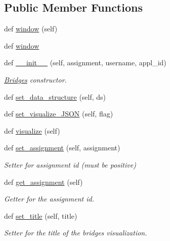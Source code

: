 \subsection*{Public Member Functions}
\begin{DoxyCompactItemize}
\item 
def \hyperlink{classbridges_1_1bridges_1_1_bridges_a1340374df9e4aa1490d9cd9be2b0e918}{window} (self)
\item 
def \hyperlink{classbridges_1_1bridges_1_1_bridges_ab434ee3f7b3b8c9eb4f8a07d97789a82}{window}
\item 
def \hyperlink{classbridges_1_1bridges_1_1_bridges_af174072883f6f269a9fe7cc02e12c276}{\+\_\+\+\_\+init\+\_\+\+\_\+} (self, assignment, username, appl\+\_\+id)
\begin{DoxyCompactList}\small\item\em \hyperlink{classbridges_1_1bridges_1_1_bridges}{Bridges} constructor. \end{DoxyCompactList}\item 
def \hyperlink{classbridges_1_1bridges_1_1_bridges_a868f02fa66c87c1a1fc7bd6fbc799291}{set\+\_\+data\+\_\+structure} (self, ds)
\item 
def \hyperlink{classbridges_1_1bridges_1_1_bridges_ab50d018b5178ca33de24157b7b6de285}{set\+\_\+visualize\+\_\+\+J\+S\+ON} (self, flag)
\item 
def \hyperlink{classbridges_1_1bridges_1_1_bridges_a3c1321f8be7b249639a47eba10b67c70}{visualize} (self)
\item 
def \hyperlink{classbridges_1_1bridges_1_1_bridges_add46441bec1c93095c48adc724b90e12}{set\+\_\+assignment} (self, assignment)
\begin{DoxyCompactList}\small\item\em Setter for assignment id (must be positive) \end{DoxyCompactList}\item 
def \hyperlink{classbridges_1_1bridges_1_1_bridges_a1e7bd56f6a3beb03c91fc989cf3f7eb8}{get\+\_\+assignment} (self)
\begin{DoxyCompactList}\small\item\em Getter for the assignment id. \end{DoxyCompactList}\item 
def \hyperlink{classbridges_1_1bridges_1_1_bridges_a3b0c629c1ae0beaac05fa9d90846c423}{set\+\_\+title} (self, title)
\begin{DoxyCompactList}\small\item\em Setter for the title of the bridges visualization. \end{DoxyCompactList}\item 

\end{DoxyCompactItemize}
